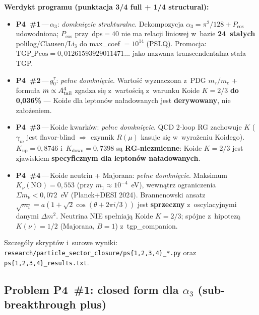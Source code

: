 \medskip\noindent\textbf{Werdykt programu (punktacja 3/4 full + 1/4 structural):}
\begin{itemize}\itemsep0pt
  \item \textbf{P4~\#1}\,---\,$\alpha_3$: \emph{domkni\k{e}cie strukturalne}.
    Dekompozycja $\alpha_3 = \pi^2/128 + P_{\cos}$ udowodniona;
    $P_{\cos}$ przy~dps$=40$ nie ma relacji liniowej
    w~bazie \textbf{24~sta\l{}ych} polilog/Clausen/Li$_3$
    do max\_coef $=10^{14}$ (PSLQ). Promocja:
    \textbf{$\mathrm{TGP\_Pcos} = 0{,}01261593929011471\ldots$}
    jako nazwana transcendentalna sta\l{}a TGP.
  \item \textbf{P4~\#2}\,---\,$g_0^\tau$: \emph{pe\l{}ne domkni\k{e}cie}.
    Warto\'s\'c wyznaczona z~PDG $m_\tau/m_e$ + formu\l{}a $m \propto A_{\rm tail}^4$
    zgadza si\k{e} z~warto\'sci\k{a} z~warunku Koide $K=2/3$
    \textbf{do 0{,}036\%} ---
    Koide dla lepton\'ow naładowanych jest \textbf{derywowany},
    nie za\l{}o\.zeniem.
  \item \textbf{P4~\#3}\,---\,Koide kwark\'ow: \emph{pe\l{}ne domkni\k{e}cie}.
    QCD 2-loop RG zachowuje $K$ ($\gamma_m$ jest flavor-blind $\Rightarrow$
    czynnik $R(\mu)$ kasuje si\k{e} w~wyra\.zeniu Koidego).
    $K_\text{up}=0{,}8746$ i~$K_\text{down}=0{,}7398$ s\k{a}
    \textbf{RG-niezmienne}: Koide $K=2/3$ jest zjawiskiem
    \textbf{specyficznym dla lepton\'ow naładowanych}.
  \item \textbf{P4~\#4}\,---\,Koide neutrin + Majorana:
    \emph{pe\l{}ne domkni\k{e}cie}.
    Maksimum $K_\nu(\text{NO})=0{,}553$ (przy $m_1 \approx 10^{-4}$~eV),
    wewn\k{a}trz ograniczenia $\Sigma m_\nu < 0{,}072$~eV (Planck+DESI 2024).
    Brannenowski ansatz $\sqrt{m_i} = a(1+\sqrt{2}\cos(\theta+2\pi i/3))$
    jest \textbf{sprzeczny} z~oscylacyjnymi danymi $\Delta m^2$.
    Neutrina NIE spe\l{}niaj\k{a} Koide $K=2/3$; spójne
    z~hipotez\k{a} $K(\nu)=1/2$ (Majorana, $B=1$) z~tgp\_companion.
\end{itemize}

\medskip\noindent
Szczeg\'o\l{}y skrypt\'ow i~surowe wyniki:
\texttt{research/particle\_sector\_closure/ps\{1,2,3,4\}\_*.py}
oraz \texttt{ps\{1,2,3,4\}\_results.txt}.

\subsection{Problem P4~\#1: closed form dla $\alpha_3$
(sub-breakthrough plus)}%
\label{app:P4-alpha3}

